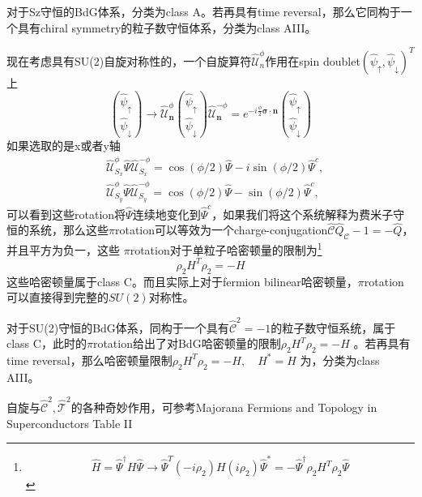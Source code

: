 \documentclass[10pt,openany]{book}
\theoremstyle{thmstyle} %
\theoremstyle{defstyle} %
\theoremstyle{prostyle} %
\begin{document}
\begin{tcolorbox}
  对于Sz守恒的BdG体系，分类为class A。若再具有time reversal，那么它同构于一个具有chiral symmetry的粒子数守恒体系，分类为class AIII。
\end{tcolorbox}
现在考虑具有SU(2)自旋对称性的，一个自旋算符$ \hat{\mathscr{U}}_n^\phi $作用在spin doublet$\left(\hat{\psi}_{\uparrow}, \hat{\psi}_{\downarrow}\right)^T $ 上
\begin{equation*}
  \binom{\hat{\psi}_{\uparrow}}{\hat{\psi}_{\downarrow}} \rightarrow \hat{\mathscr{U}}_{\boldsymbol{n}}^\phi\binom{\hat{\psi}_{\uparrow}}{\hat{\psi}_{\downarrow}} \hat{\mathscr{U}}_{\boldsymbol{n}}^{-\phi}=e^{-i \frac{\phi}{2} \boldsymbol{\sigma} \cdot \boldsymbol{n}}\binom{\hat{\psi}_{\uparrow}}{\hat{\psi}_{\downarrow}}
\end{equation*}
如果选取的是x或者y轴
\begin{equation*}
  \begin{aligned}
    & \hat{\mathscr{U}}_{S_x}^\phi \hat{\Psi} \hat{\mathscr{U}}_{S_x}^{-\phi}=\cos (\phi / 2) \hat{\Psi}-i \sin (\phi / 2) \hat{\Psi}^c, \\
    & \hat{\mathscr{U}}_{S_y}^\phi \hat{\Psi} \hat{\mathscr{U}}_{S_y}^{-\phi}=\cos (\phi / 2) \hat{\Psi}-\sin (\phi / 2) \hat{\Psi}^c,
    \end{aligned}
\end{equation*}
可以看到这些rotation将$ \hat{\Psi} $连续地变化到$ \hat{\Psi}^c $，如果我们将这个系统解释为费米子守恒的系统，那么这些$\pi$rotation可以等效为一个charge-conjugation$ \hat{\mathscr{C}} \hat{Q}_{\mathscr{C}}-1=-\hat{Q} $，并且平方为负一，这些 $\pi$rotation对于单粒子哈密顿量的限制为\footnote{\begin{equation*}
  \hat{H}=\hat{\Psi}^{\dagger} H \hat{\Psi}\to\hat{\Psi}^T(-i\rho_2)H(i\rho_2)\hat{\Psi}^*=-\hat{\Psi}^{\dagger} \rho_2H^T\rho_2 \hat{\Psi}
\end{equation*} }
\begin{equation*}
  \rho_2 H^T \rho_2=-H
\end{equation*}
这些哈密顿量属于class C。而且实际上对于fermion bilinear哈密顿量，$\pi$rotation可以直接得到完整的$ SU(2) $对称性。
\begin{tcolorbox}
  对于SU(2)守恒的BdG体系，同构于一个具有$ \hat{\mathscr{C}}^2=-1 $的粒子数守恒系统，属于class C，此时的$\pi$rotation给出了对BdG哈密顿量的限制$ \rho_2 H^T \rho_2=-H $  。若再具有time reversal，那么哈密顿量限制$ \rho_2 H^T \rho_2=-H, \quad H^*=H $ 为，分类为class AIII。
\end{tcolorbox}
自旋与$ \hat{\mathscr{C}}^2 ,\hat{\mathscr{T}}^2$的各种奇妙作用，可参考Majorana Fermions and Topology in Superconductors Table II 
\end{document}
